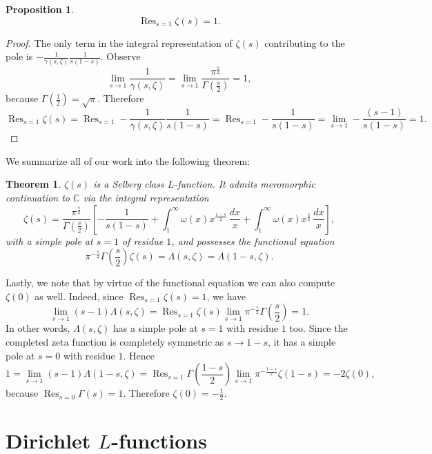 \documentclass[12pt]{book}
\newtheorem{theorem}{Theorem}[section]
\newtheorem{proposition}{Proposition}[section]
\theoremstyle{definition}\newframedtheorem{method}{Method}
\newcommand{\C}{\mathbb{C}}
\newcommand{\g}{\gamma}
\newcommand{\z}{\zeta}
\newcommand{\w}{\omega}
\newcommand{\G}{\Gamma}
\renewcommand{\L}{\Lambda}
\newcommand{\<}{\langle}
\renewcommand{\>}{\rangle}
\DeclareMathOperator*{\Res}{\mathrm{Res}}
\begin{document}
      \begin{proposition}\label{prop:zeta_residue}
        \[
          \Res_{s = 1}\z(s) = 1.
        \]
      \end{proposition}
      \begin{proof}
        The only term in the integral representation of $\z(s)$ contributing to the pole is $-\frac{1}{\g(s,\z)}\frac{1}{s(1-s)}$. Observe
        \[
          \lim_{s \to 1}\frac{1}{\g(s,\z)} = \lim_{s \to 1}\frac{\pi^{\frac{s}{2}}}{\G\left(\frac{s}{2}\right)} = 1,
        \]
        because $\G\left(\frac{1}{2}\right) = \sqrt{\pi}$. Therefore
        \[
          \Res_{s = 1}\z(s) = \Res_{s = 1}-\frac{1}{\g(s,\z)}\frac{1}{s(1-s)} = \Res_{s = 1}-\frac{1}{s(1-s)} = \lim_{s \to 1}-\frac{(s-1)}{s(1-s)} = 1.
        \]
      \end{proof}

      We summarize all of our work into the following theorem:

      \begin{theorem}
        $\z(s)$ is a Selberg class $L$-function. It admits meromorphic continuation to $\C$ via the integral representation
        \[
          \z(s) = \frac{\pi^{\frac{s}{2}}}{\G\left(\frac{s}{2}\right)}\left[-\frac{1}{s(1-s)}+\int_{1}^{\infty}\w(x)x^{\frac{1-s}{2}}\,\frac{dx}{x}+\int_{1}^{\infty}\w(x)x^{\frac{s}{2}}\,\frac{dx}{x}\right],
        \]
        with a simple pole at $s = 1$ of residue $1$, and possesses the functional equation
        \[
          \pi^{-\frac{s}{2}}\G\left(\frac{s}{2}\right)\z(s) = \L(s,\z) = \L(1-s,\z).
        \]
      \end{theorem}

      Lastly, we note that by virtue of the functional equation we can also compute $\z(0)$ as well. Indeed, since $\Res_{s = 1}\z(s) = 1$, we have
        \[
          \lim_{s \to 1}(s-1)\L(s,\z) = \Res_{s = 1}\z(s)\lim_{s \to 1}\pi^{-\frac{s}{2}}\G\left(\frac{s}{2}\right) = 1.
        \]
        In other words, $\L(s,\z)$ has a simple pole at $s = 1$ with residue $1$ too. Since the completed zeta function is completely symmetric as $s \to 1-s$, it has a simple pole at $s = 0$ with residue $1$. Hence
        \[
          1 = \lim_{s \to 1}(s-1)\L(1-s,\z) = \Res_{s = 1}\G\left(\frac{1-s}{2}\right)\lim_{s \to 1}\pi^{-\frac{1-s}{2}}\z(1-s) = -2\z(0),
        \]
        because $\Res_{s = 0}\G(s) = 1$. Therefore $\z(0) = -\frac{1}{2}$.
  \section{Dirichlet \texorpdfstring{$L$}{L}-functions}
\end{document}
